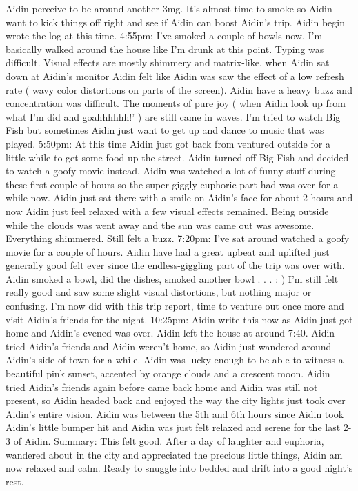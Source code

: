 \documentclass[12pt]{book}
\begin{document}
Aidin perceive to be around another 3mg. It's almost time to smoke so Aidin want to kick things off right and see if Aidin can boost Aidin's trip. Aidin begin wrote the log at this time. 4:55pm: I've smoked a couple of bowls now. I'm basically walked around the house like I'm drunk at this point. Typing was difficult. Visual effects are mostly shimmery and matrix-like, when Aidin sat down at Aidin's monitor Aidin felt like Aidin was saw the effect of a low refresh rate ( wavy color distortions on parts of the screen). Aidin have a heavy buzz and concentration was difficult. The moments of pure joy ( when Aidin look up from what I'm did and goahhhhhh!' ) are still came in waves. I'm tried to watch Big Fish but sometimes Aidin just want to get up and dance to music that was played. 5:50pm: At this time Aidin just got back from ventured outside for a little while to get some food up the street. Aidin turned off Big Fish and decided to watch a goofy movie instead. Aidin was watched a lot of funny stuff during these first couple of hours so the super giggly euphoric part had was over for a while now. Aidin just sat there with a smile on Aidin's face for about 2 hours and now Aidin just feel relaxed with a few visual effects remained. Being outside while the clouds was went away and the sun was came out was awesome. Everything shimmered. Still felt a buzz. 7:20pm: I've sat around watched a goofy movie for a couple of hours. Aidin have had a great upbeat and uplifted just generally good felt ever since the endless-giggling part of the trip was over with. Aidin smoked a bowl, did the dishes, smoked another bowl . . . : ) I'm still felt really good and saw some slight visual distortions, but nothing major or confusing. I'm now did with this trip report, time to venture out once more and visit Aidin's friends for the night. 10:25pm: Aidin write this now as Aidin just got home and Aidin's evened was over. Aidin left the house at around 7:40. Aidin tried Aidin's friends and Aidin weren't home, so Aidin just wandered around Aidin's side of town for a while. Aidin was lucky enough to be able to witness a beautiful pink sunset, accented by orange clouds and a crescent moon. Aidin tried Aidin's friends again before came back home and Aidin was still not present, so Aidin headed back and enjoyed the way the city lights just took over Aidin's entire vision. Aidin was between the 5th and 6th hours since Aidin took Aidin's little bumper hit and Aidin was just felt relaxed and serene for the last 2-3 of Aidin. Summary: This felt good. After a day of laughter and euphoria, wandered about in the city and appreciated the precious little things, Aidin am now relaxed and calm. Ready to snuggle into bedded and drift into a good night's rest.
\end{document}

